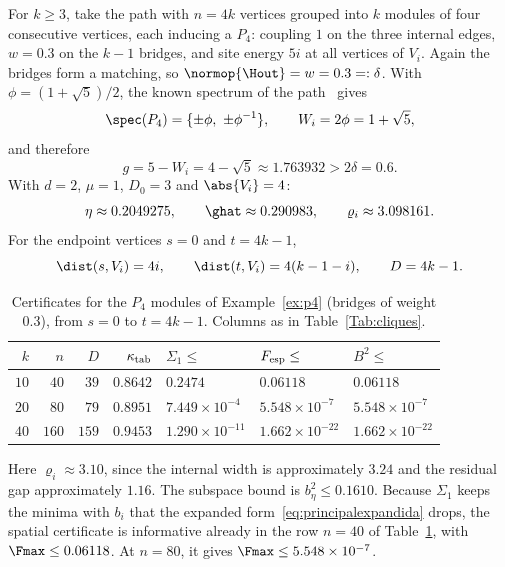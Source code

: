 \begin{exemplo}\label{ex:p4}
For $k\ge3$, take the path with $n=4k$ vertices grouped into $k$ modules of four
consecutive vertices, each inducing a $P_4$: coupling $1$ on the three internal
edges, $w=0.3$ on the $k-1$ bridges, and site energy $5i$ at all vertices
of $V_i$. Again the bridges form a matching, so
$\normop{\Hout}=w=0.3=: \delta$. With
$\phi=(1+\sqrt5)/2$, the known spectrum of the path~\cite{brouwer2012} gives
\[
\spec(P_4)=\{\pm\phi,\ \pm\phi^{-1}\},\qquad
W_i=2\phi=1+\sqrt5,
\]
and therefore
\[
g=5-W_i=4-\sqrt5\approx1.763932>2\delta=0.6.
\]
With $d=2$, $\mu=1$, $D_0=3$ and $\abs{V_i}=4$:
\[
\eta\approx0.2049275,\qquad \ghat\approx0.290983,
\qquad \varrho_i\approx3.098161 .
\]
For the endpoint vertices $s=0$ and $t=4k-1$,
\[
\dist(s,V_i)=4i,\qquad
\dist(t,V_i)=4(k-1-i),\qquad
D=4k-1.
\]

\begin{table}[t]
\centering
\small
\setlength{\tabcolsep}{4pt}
\caption{Certificates for the $P_4$ modules of Example~\ref{ex:p4} (bridges of
weight $0.3$), from $s=0$ to $t=4k-1$. Columns as in Table~\ref{Tab:cliques}.}
\label{Tab:p4}
\begin{tabular}{rrrrlll}
\toprule
$k$ & $n$ & $D$ & $\kappa_{\rm tab}$ & $\Sigma_1\le$ & $F_{\rm esp}\le$ & $B^2\le$\\
\midrule
$10$ & $40$ & $39$ & $0.8642$ & $0.2474$ & $0.06118$ & $0.06118$\\
$20$ & $80$ & $79$ & $0.8951$ & $7.449\times10^{-4}$ & $5.548\times10^{-7}$ & $5.548\times10^{-7}$\\
$40$ & $160$ & $159$ & $0.9453$ & $1.290\times10^{-11}$ & $1.662\times10^{-22}$ & $1.662\times10^{-22}$\\
\bottomrule
\end{tabular}
\end{table}

\noindent Here $\varrho_i\approx3.10$, since the internal width is
approximately $3.24$ and the residual gap approximately $1.16$.
The subspace bound is $b_\eta^2\le0.1610$.
Because $\Sigma_1$ keeps the minima with $b_i$ that the expanded
form~\eqref{eq:principalexpandida} drops, the spatial certificate is informative
already in the row $n=40$ of Table~\ref{Tab:p4}, with $\Fmax\le0.06118$. At
$n=80$, it gives $\Fmax\le5.548\times10^{-7}$.
\end{exemplo}
